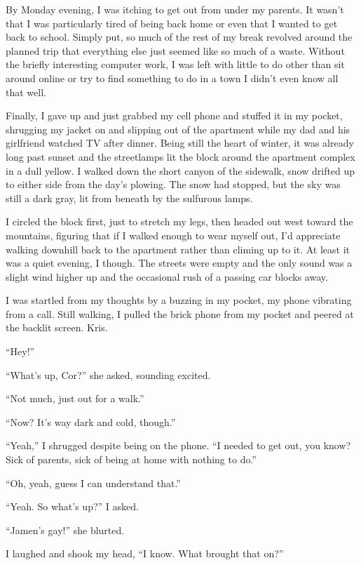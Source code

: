 By Monday evening, I was itching to get out from under my parents.  It wasn't that I was particularly tired of being back home or even that I wanted to get back to school.  Simply put, so much of the rest of my break revolved around the planned trip that everything else just seemed like so much of a waste.  Without the briefly interesting computer work, I was left with little to do other than sit around online or try to find something to do in a town I didn't even know all that well.

Finally, I gave up and just grabbed my cell phone and stuffed it in my pocket, shrugging my jacket on and slipping out of the apartment while my dad and his girlfriend watched TV after dinner.  Being still the heart of winter, it was already long past sunset and the streetlamps lit the block around the apartment complex in a dull yellow.  I walked down the short canyon of the sidewalk, snow drifted up to either side from the day's plowing.  The snow had stopped, but the sky was still a dark gray, lit from beneath by the sulfurous lamps.

I circled the block first, just to stretch my legs, then headed out west toward the mountains, figuring that if I walked enough to wear myself out, I'd appreciate walking downhill back to the apartment rather than climing up to it.  At least it was a quiet evening, I though.  The streets were empty and the only sound was a slight wind higher up and the occasional rush of a passing car blocks away.

I was startled from my thoughts by a buzzing in my pocket, my phone vibrating from a call.  Still walking, I pulled the brick phone from my pocket and peered at the backlit screen.  Kris.

``Hey!''

``What's up, Cor?'' she asked, sounding excited.

``Not much, just out for a walk.''

``Now?  It's way dark and cold, though.''

``Yeah,'' I shrugged despite being on the phone.  ``I needed to get out, you know?  Sick of parents, sick of being at home with nothing to do.''

``Oh, yeah, guess I  can understand that.''

``Yeah.  So what's up?'' I asked.

``Jamen's gay!'' she blurted.

I laughed and shook my head, ``I know.  What brought that on?''

